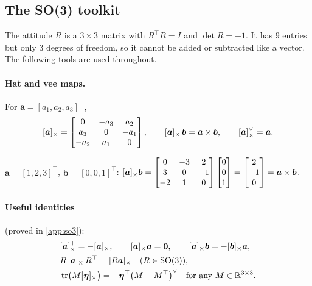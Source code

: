 \subsection{The SO(3) toolkit}
\label{sec:so3}

The attitude $R$ is a $3\times3$ matrix with $R^\top R=I$ and $\det R=+1$. It has 9 entries but only
3 degrees of freedom, so it cannot be added or subtracted like a vector. The following tools are used throughout.

\paragraph{Hat and vee maps.} For $\bm a=[a_1,a_2,a_3]^\top$,
\begin{equation}
\label{eq:hat}
  [\bm a]_{\times}=\begin{bmatrix}0&-a_3&a_2\\ a_3&0&-a_1\\ -a_2&a_1&0\end{bmatrix},
  \qquad [\bm a]_{\times}\,\bm b=\bm a\times\bm b,\qquad [\bm a]_{\times}^\vee=\bm a.
\end{equation}

\begin{toybox}
$\bm a=[1,2,3]^\top$, $\bm b=[0,0,1]^\top$:\quad
$[\bm a]_{\times}\bm b=\begin{bmatrix}0&-3&2\\3&0&-1\\-2&1&0\end{bmatrix}\begin{bmatrix}0\\0\\1\end{bmatrix}=\begin{bmatrix}2\\-1\\0\end{bmatrix}
=\bm a\times\bm b$.
\end{toybox}

\paragraph{Useful identities} (proved in \cref{app:so3}):
\begin{align}
  &[\bm a]_{\times}^\top=-[\bm a]_{\times},\qquad [\bm a]_{\times}\bm a=\bm 0,\qquad [\bm a]_{\times}\bm b=-[\bm b]_{\times}\bm a, \label{eq:id1}\\
  &R\,[\bm a]_{\times}\,R^\top=[R\bm a]_{\times}\quad (R\in\mathrm{SO}(3)), \label{eq:id2}\\
  &\operatorname{tr}\!\big(M[\bm\eta]_{\times}\big)=-\bm\eta^\top\big(M-M^\top\big)^\vee\quad\text{for any }M\in\mathbb{R}^{3\times3}. \label{eq:id3}
\end{align}

